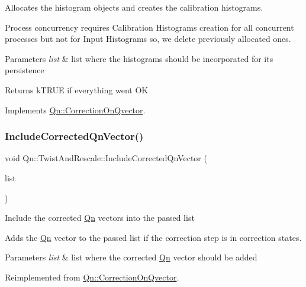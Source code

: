 Allocates the histogram objects and creates the calibration histograms.

Process concurrency requires Calibration Histograms creation for all concurrent processes but not for Input Histograms so, we delete previously allocated ones. 
\begin{DoxyParams}{Parameters}
{\em list} & list where the histograms should be incorporated for its persistence \\
\hline
\end{DoxyParams}
\begin{DoxyReturn}{Returns}
k\+T\+R\+UE if everything went OK 
\end{DoxyReturn}


Implements \mbox{\hyperlink{classQn_1_1CorrectionOnQvector_addcdd98787c99ea34a2511be2cdc8de4}{Qn\+::\+Correction\+On\+Qvector}}.

\mbox{\label{classQn_1_1TwistAndRescale_aad00583024f1a71458d6c86ba1cc4d44}} 
\subsubsection{\texorpdfstring{Include\+Corrected\+Qn\+Vector()}{IncludeCorrectedQnVector()}}
{\footnotesize\ttfamily void Qn\+::\+Twist\+And\+Rescale\+::\+Include\+Corrected\+Qn\+Vector (\begin{DoxyParamCaption}\item[{T\+List $\ast$}]{list }\end{DoxyParamCaption})\hspace{0.3cm}{\ttfamily [virtual]}}

Include the corrected \mbox{\hyperlink{namespaceQn}{Qn}} vectors into the passed list

Adds the \mbox{\hyperlink{namespaceQn}{Qn}} vector to the passed list if the correction step is in correction states. 
\begin{DoxyParams}{Parameters}
{\em list} & list where the corrected \mbox{\hyperlink{namespaceQn}{Qn}} vector should be added \\
\hline
\end{DoxyParams}


Reimplemented from \mbox{\hyperlink{classQn_1_1CorrectionOnQvector_a42d85f899f00a6e816969d5784c50765}{Qn\+::\+Correction\+On\+Qvector}}.

